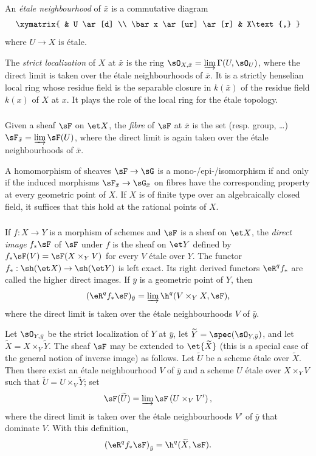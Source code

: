 \documentclass[oneside]{book}
\begin{document}
An \emph{étale neighbourhood} of $\bar x$ is a commutative diagram
\[\xymatrix{
  & U \ar[d] \\
  \bar x \ar[ur] \ar[r]
  & X\text{,}
}\]
where $U\to X$ is étale.

The \emph{strict localization} of $X$ at $\bar x$ is the ring
$\sO_{X,\bar x}=\varinjlim\Gamma(U,\sO_U)$, where the direct limit is
taken over the étale neighbourhoods of $\bar x$. It is a strictly henselian
local ring whose residue field is the separable closure in $k(\bar x)$
of the residue field $k(x)$ of $X$ at $x$. It plays the role of the local
ring for the étale topology.

\subsubsection{}\label{I:2-3-2}

Given a sheaf $\sF$ on $\et X$, the \emph{fibre} of $\sF$ at $\bar x$
is the set (resp. group, \dots)
$\sF_{\bar x}=\varinjlim\sF(U)$, where the direct limit is again taken
over the étale neighbourhoods of $\bar x$.

A homomorphism of sheaves $\sF\to\sG$ is a mono-/epi-/isomorphism if and
only if the induced morphisms $\sF_{\bar x}\to\sG_{\bar x}$ on fibres
have the corresponding property at every geometric point of $X$. If $X$
is of finite type over an algebraically closed field, it suffices that
this hold at the rational points of $X$.

\subsubsection{}\label{I:2-3-3}

If $f:X\to Y$ is a morphism of schemes and $\sF$ is a sheaf on
$\et X$, the \emph{direct image} $f_*\sF$ of $\sF$ under $f$ is the
sheaf on $\et Y$ defined by
$f_*\sF(V)=\sF(X\times_YV)$ for every $V$ étale over $Y$. The functor
$f_*:\sh(\et X)\to\sh(\et Y)$ is left exact. Its right derived functors
$\eR^qf_*$ are called the higher direct images. If $\bar y$ is a
geometric point of $Y$, then
\[
  (\eR^q f_* \sF)_{\bar y} = \varinjlim \h^q(V\times_Y X,\sF)\text{,}
\]
where the direct limit is taken over the étale neighbourhoods $V$ of
$\bar y$.

Let $\sO_{Y,\bar y}$ be the strict localization of $Y$ at $\bar y$,
let $\widetilde Y=\spec(\sO_{Y,\bar y})$, and let
$\widetilde X=X\times_Y\widetilde Y$. The sheaf $\sF$ may be extended
to $\et{\widetilde X}$ (this is a special case of the general notion of
inverse image) as follows. Let $\widetilde U$ be a scheme étale over
$\widetilde X$. Then there exist an étale neighbourhood $V$ of $\bar y$
and a scheme $U$ étale over $X\times_YV$ such that
$\widetilde U=U\times_V\widetilde Y$; set
\[
  \sF(\widetilde U)=\varinjlim \sF\left(U\times_V V'\right)\text{,}
\]
where the direct limit is taken over the étale neighbourhoods $V'$ of
$\bar y$ that dominate $V$. With this definition,
\[
  \left(\eR^q f_* \sF\right)_{\bar y} = \h^q(\widetilde X,\sF)\text{.}
\]
\end{document}
